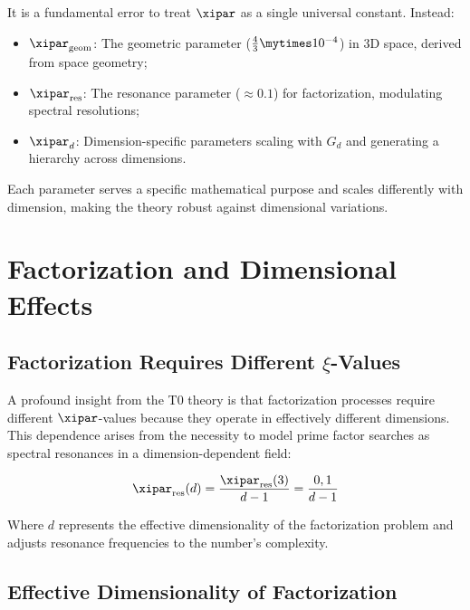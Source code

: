 \begin{tcolorbox}[colback=red!5!white,colframe=red!75!black,title={Critical Understanding: Multiple $\xi$-Parameters},width=\textwidth]
	It is a fundamental error to treat $\xipar$ as a single universal constant. Instead:
	\begin{itemize}
		\item $\xipar_{\text{geom}}$: The geometric parameter ($\frac{4}{3} \mytimes 10^{-4}$) in 3D space, derived from space geometry;
		\item $\xipar_{\text{res}}$: The resonance parameter ($\approx 0.1$) for factorization, modulating spectral resolutions;
		\item $\xipar_d$: Dimension-specific parameters scaling with $G_d$ and generating a hierarchy across dimensions.
	\end{itemize}
	Each parameter serves a specific mathematical purpose and scales differently with dimension, making the theory robust against dimensional variations.
\end{tcolorbox}
	
	\section{Factorization and Dimensional Effects}
	\label{sec:factorization_dimensional}
	
	\subsection{Factorization Requires Different $\xi$-Values}
	\label{subsec:factorization_xi}
	
	A profound insight from the T0 theory is that factorization processes require different $\xipar$-values because they operate in effectively different dimensions. This dependence arises from the necessity to model prime factor searches as spectral resonances in a dimension-dependent field:
	
	\begin{equation}
		\xipar_{\text{res}}(d) = \frac{\xipar_{\text{res}}(3)}{d-1} = \frac{0,1}{d-1}
	\end{equation}
	
	Where $d$ represents the effective dimensionality of the factorization problem and adjusts resonance frequencies to the number's complexity.
	
	\subsection{Effective Dimensionality of Factorization}
	\label{subsec:effective_dimensionality}
	
